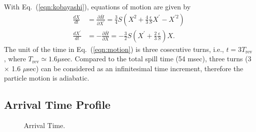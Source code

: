 \documentclass[aps,prstab,onecolumn,preprint,endfloats,11pt]{revtex4-1}
\begin{document}
With Eq.~(\ref{eqn:kobayashi}), equations of motion are given by
\begin{equation}
 \begin{split}
  \frac{dX}{dt} & = \frac{\partial \bar{H}}{\partial X^{\prime}}
                  = \frac{3}{4} S
                    \left(
                      X^{2} + \frac{4}{3} \frac{\epsilon}{S} X^{\prime}
                    - X^{\prime 2}
                    \right) \\
  \frac{dX^{\prime}}{dt} & = - \frac{\partial \bar{H}}{\partial X}
                           = - \frac{3}{2} S \left( X^{\prime}
                            + \frac{2}{3} \frac{\epsilon}{S} \right) X.
 \end{split}
\label{eqn:motion}
\end{equation}
The unit of the time in Eq.~(\ref{eqn:motion}) is three cosecutive turns, i.e., $t = 3 T_{\text{rev}}$, where $T_{\text{rev}} \simeq 1.6 \mu$sec.
Compared to the total spill time (54 msec), three turns (3 $\times$ 1.6 $\mu$sec) can be considered as an infinitesimal time increment, therefore the particle motion is adiabatic. 

\subsection{\label{sec:arrival}Arrival Time Profile}

\begin{figure}[!tbp]
  \caption{\label{fig:arrival3}Arrival Time.}
\end{figure}
\end{document}
